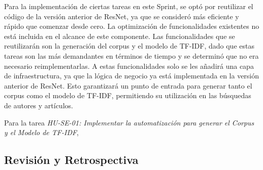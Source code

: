 Para la implementación de ciertas tareas en este Sprint, se optó por reutilizar el código de la versión anterior de ResNet, ya que se consideró más eficiente y rápido que comenzar desde cero.
La optimización de funcionalidades existentes no está incluida en el alcance de este componente.
Las funcionalidades que se reutilizarán son la generación del corpus y el modelo de TF-IDF,
dado que estas tareas son las más demandantes en términos de tiempo y se determinó que no era necesario reimplementarlas.
A estas funcionalidades solo se les añadirá una capa de infraestructura,
ya que la lógica de negocio ya está implementada en la versión anterior de ResNet.
Esto garantizará un punto de entrada para generar tanto el corpus como el modelo de TF-IDF,
permitiendo su utilización en las búsquedas de autores y artículos.

Para la tarea \textit{HU-SE-01: Implementar la automatización para generar el Corpus y el Modelo de TF-IDF}, 

\subsection{Revisión y Retrospectiva}
